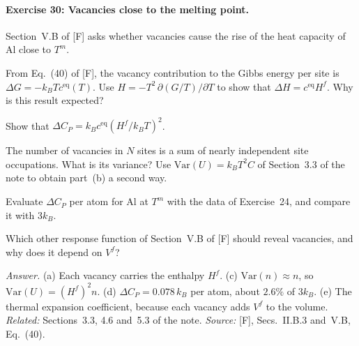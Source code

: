 \documentclass[11pt]{article}      %
\numberwithin{equation}{section}   %
\begin{document}
\paragraph{Exercise 30: Vacancies close to the melting point.}
Section~V.B of [F] asks whether vacancies cause the rise of the heat capacity of Al close to $T^m$.
\begin{parts}
    \item From Eq.~(40) of [F], the vacancy contribution to the Gibbs energy per site is $\Delta G = -k_BTc^{\text{eq}}(T)$. Use $H = -T^2\,\partial(G/T)/\partial T$ to show that $\Delta H = c^{\text{eq}}H^f$. Why is this result expected?
    \item Show that $\Delta C_P = k_Bc^{\text{eq}}(H^f/k_BT)^2$.
    \item The number of vacancies in $N$ sites is a sum of nearly independent site occupations. What is its variance? Use $\mathrm{Var}(U) = k_BT^2C$ of Section~3.3 of the note to obtain part~(b) a second way.
    \item Evaluate $\Delta C_P$ per atom for Al at $T^m$ with the data of Exercise~24, and compare it with $3k_B$.
    \item Which other response function of Section~V.B of [F] should reveal vacancies, and why does it depend on $V^f$?
\end{parts}
\textit{Answer.} (a) Each vacancy carries the enthalpy $H^f$. (c) $\mathrm{Var}(n) \approx n$, so $\mathrm{Var}(U) = (H^f)^2n$. (d) $\Delta C_P = 0.078\,k_B$ per atom, about $2.6\%$ of $3k_B$. (e) The thermal expansion coefficient, because each vacancy adds $V^f$ to the volume.\\
\textit{Related:} Sections~3.3, 4.6 and~5.3 of the note. \textit{Source:} [F], Secs.~II.B.3 and~V.B, Eq.~(40).
\end{document}
